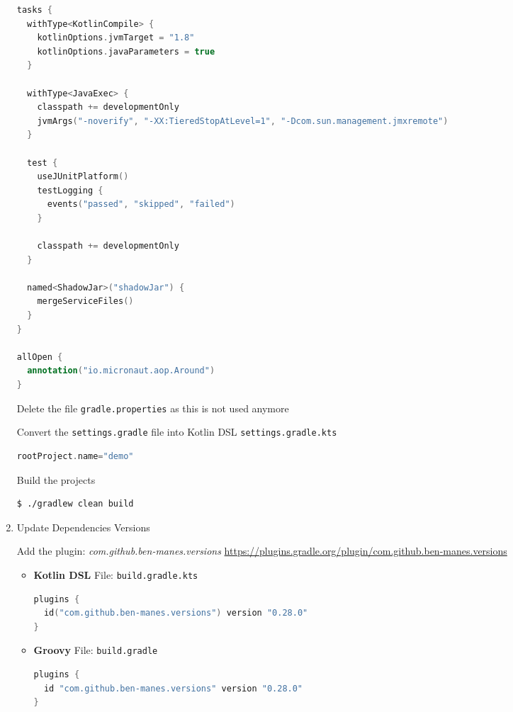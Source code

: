 \begin{enumerate}
\begin{lstlisting}[language=Kotlin]
tasks {
  withType<KotlinCompile> {
    kotlinOptions.jvmTarget = "1.8"
    kotlinOptions.javaParameters = true
  }

  withType<JavaExec> {
    classpath += developmentOnly
    jvmArgs("-noverify", "-XX:TieredStopAtLevel=1", "-Dcom.sun.management.jmxremote")
  }

  test {
    useJUnitPlatform()
    testLogging {
      events("passed", "skipped", "failed")
    }

    classpath += developmentOnly
  }

  named<ShadowJar>("shadowJar") {
    mergeServiceFiles()
  }
}

allOpen {
  annotation("io.micronaut.aop.Around")
}
\end{lstlisting}

Delete the file \texttt{gradle.properties} as this is not used anymore

Convert the \texttt{settings.gradle} file into Kotlin DSL \texttt{settings.gradle.kts}

\begin{lstlisting}[language=Kotlin]
rootProject.name="demo"
\end{lstlisting}

Build the projects

\begin{lstlisting}[language=bash]
$ ./gradlew clean build
\end{lstlisting}

\item Update Dependencies Versions

Add the plugin: \textit{com.github.ben-manes.versions}
\newline
{\footnotesize \url{https://plugins.gradle.org/plugin/com.github.ben-manes.versions}}

\begin{itemize}

\item[] \textbf{Kotlin DSL}
\newline
File: \texttt{build.gradle.kts}

\begin{lstlisting}[language=Kotlin]
plugins {
  id("com.github.ben-manes.versions") version "0.28.0"
}
\end{lstlisting}

\item[] \textbf{Groovy}
\newline
File: \texttt{build.gradle}

\begin{lstlisting}[language=Groovy]
plugins {
  id "com.github.ben-manes.versions" version "0.28.0"
}
\end{lstlisting}


\end{itemize}
\end{enumerate}

